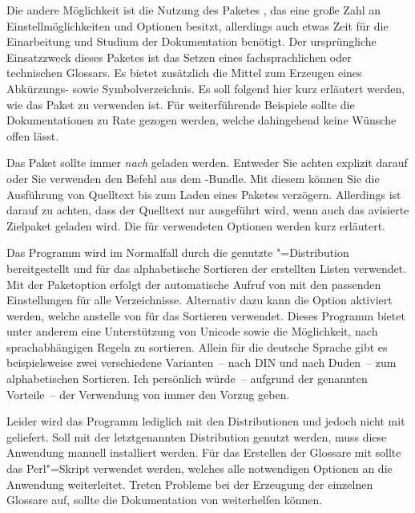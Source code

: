 \documentclass[%
  english,ngerman,%
  geometry=no,DIV=12,automark,%
]{tudscrartcl}
\begin{document}
Die andere Möglichkeit ist die Nutzung des Paketes , das 
eine große Zahl an Einstellmöglichkeiten und Optionen besitzt, allerdings auch 
etwas Zeit für die Einarbeitung und Studium der Dokumentation benötigt. Der 
ursprüngliche Einsatzzweck dieses Paketes ist das Setzen eines fachsprachlichen 
oder technischen Glossars. Es bietet zusätzlich die Mittel zum Erzeugen eines 
Abkürzungs- sowie Symbolverzeichnis. Es soll folgend hier kurz erläutert 
werden, wie das Paket zu verwenden ist. Für weiterführende Beispiele sollte 
die Dokumentationen zu Rate gezogen werden, welche dahingehend keine Wünsche 
offen lässt. 

Das Paket  sollte immer \emph{nach}  
geladen werden. Entweder Sie achten explizit darauf oder Sie verwenden den 
Befehl  aus dem \KOMAScript-Bundle. Mit diesem können Sie 
die Ausführung von Quelltext bis zum Laden eines Paketes verzögern. Allerdings 
ist darauf zu achten, dass der Quelltext nur ausgeführt wird, wenn auch das 
avisierte Zielpaket geladen wird. Die für  verwendeten 
Optionen werden kurz erläutert.
%
\begin{Preamble+}
\AfterPackage*{hyperref}{%
\end{Preamble+}
\begin{Preamble}
\usepackage[%
\end{Preamble}
%
Das Programm  wird im Normalfall durch die genutzte 
"=Distribution bereitgestellt und für das alphabetische Sortieren 
der erstellten Listen verwendet. Mit der Paketoption  erfolgt 
der automatische Aufruf von  mit den passenden 
Einstellungen für alle Verzeichnisse. Alternativ dazu kann die Option 
 aktiviert werden, welche  anstelle von 
 für das Sortieren verwendet. Dieses Programm bietet 
unter anderem eine Unterstützung von Unicode sowie die Möglichkeit, nach 
sprachabhängigen Regeln zu sortieren. Allein für die deutsche Sprache gibt es 
beispielsweise zwei verschiedene Varianten~-- nach DIN und nach Duden~-- zum 
alphabetischen Sortieren. Ich persönlich würde~-- aufgrund der genannten 
Vorteile~-- der Verwendung von  immer den Vorzug geben. 

Leider wird das Programm  lediglich mit den Distributionen 
 und  jedoch 
nicht mit  geliefert. Soll  
mit der letztgenannten Distribution genutzt werden, muss diese Anwendung 
manuell installiert werden.
Für das Erstellen der Glossare mit  sollte das Perl"=Skript 
 verwendet werden, welches alle notwendigen 
Optionen an die Anwendung weiterleitet. Treten Probleme bei der Erzeugung der 
einzelnen Glossare auf, sollte die Dokumentation von  
weiterhelfen können.
\end{document}
